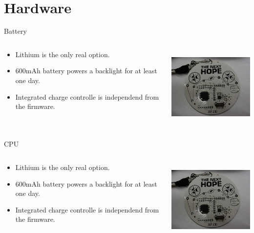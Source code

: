 \documentclass{beamer}
\begin{document}
\section{Hardware}
\begin{frame}{Battery}
  \begin{columns}
    \begin{column}{6cm}
        \begin{itemize}
		\item Lithium is the only real option.
		\item 600mAh battery powers a backlight for at least one day.
		\item Integrated charge controlle is independend from the firmware.
	\end{itemize}
    \end{column}
    \begin{column}{6cm}
        \includegraphics[height=4cm]{bilder/battery.jpg}
    \end{column}
  \end{columns}
\end{frame}
\begin{frame}{CPU}
  \begin{columns}
    \begin{column}{6cm}
        \begin{itemize}
		\item Lithium is the only real option.
		\item 600mAh battery powers a backlight for at least one day.
		\item Integrated charge controlle is independend from the firmware.
	\end{itemize}
    \end{column}
    \begin{column}{6cm}
        \includegraphics[height=4cm]{bilder/battery.jpg}
    \end{column}
  \end{columns}
\end{frame}
\end{document}
